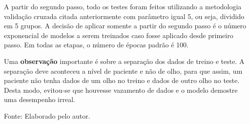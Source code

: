 \documentclass[ %
	msc, %
	portugues %
]{../ppgccufmg}
\begin{document}
    A partir do segundo passo, todo os testes foram feitos utilizando a metodologia validação
    cruzada citada anteriormente com parâmetro igual 5, ou seja, dividido em 5 grupos. A decisão de
    aplicar somente a partir do segundo passo é o número exponencial de modelos a serem treinados
    caso fosse aplicado desde primeiro passo. Em todas as etapas, o número de épocas padrão é 100.

    Uma \textbf{observação} importante é sobre a separação dos dados de treino e teste. A separação
    deve aconteceu a nível de paciente e não de olho, para que assim, um paciente não tenha dados de
    um olho no treino e dados de outro olho no teste. Desta modo, evitou-se que houvesse vazamento de
    dados e o modelo demostre uma desempenho irreal.

    \begin{table}[h]
    \centering
    \setlength{\extrarowheight}{0pt}
    \addtolength{\extrarowheight}{\aboverulesep}
    \addtolength{\extrarowheight}{\belowrulesep}
    \setlength{\aboverulesep}{0pt}
    \setlength{\belowrulesep}{0pt}
    \caption{Versões dos modelos visuais utilizados como Backbones  e o total de parâmetros de cada um. O modelo ViT é o que possui maior número de parâmetros, aproximadamente 86 milhões, enquanto o modelo Shuffle possui somente 2.5 milhões. }
    \label{tab:bversions}
        \small{Fonte: Elaborado pelo autor.}
    \end{table}
\end{document}
